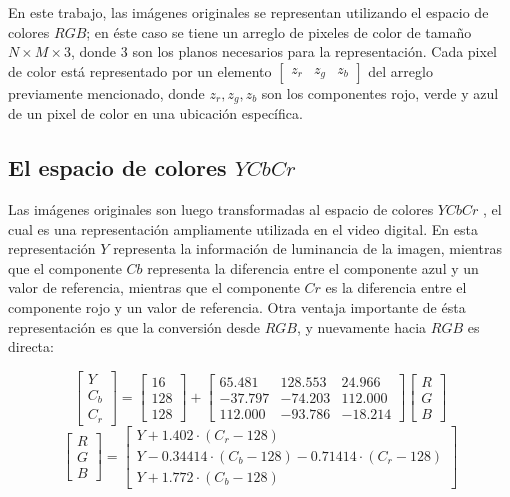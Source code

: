 En este trabajo, las imágenes originales se representan utilizando el espacio de colores $RGB$; en éste caso se tiene un arreglo de pixeles de color de tamaño $N \times M \times 3$, donde 3 son los planos necesarios para la representación. Cada pixel de color está representado por un elemento $[\begin{matrix}z_r & z_g & z_b\end{matrix}]$ del arreglo previamente mencionado, donde $z_r, z_g, z_b$ son los componentes rojo, verde y azul de un pixel de color en una ubicación específica. 

\subsection{El espacio de colores $YCbCr$}

Las imágenes originales son luego transformadas al espacio de colores $YCbCr$ \cite{gonzalez2002processing}, el cual es una representación ampliamente utilizada en el video digital. En esta representación $Y$ representa la información de luminancia de la imagen, mientras que el componente $Cb$ representa la diferencia entre el componente azul y un valor de referencia, mientras que el componente $Cr$ es la diferencia entre el componente rojo y un valor de referencia. Otra ventaja importante de ésta representación es que la conversión desde $RGB$, y nuevamente hacia $RGB$ es directa:

\begin{equation}
\begin{bmatrix}
Y \\
C_b \\
C_r 
\end{bmatrix} =
\begin{bmatrix}
16  \\
128 \\
128
\end{bmatrix}
+
\begin{bmatrix}
65.481 & 128.553 & 24.966 \\
-37.797 & -74.203 & 112.000 \\
112.000 & -93.786 & -18.214 
\end{bmatrix}
\begin{bmatrix}
R \\
G \\
B 
\end{bmatrix}
\end{equation}
\begin{equation}
\begin{bmatrix}
R \\
G \\
B 
\end{bmatrix} =
\begin{bmatrix}
Y + 1.402 \cdot (C_r - 128) \\
Y -0.34414 \cdot (C_b - 128) - 0.71414 \cdot (C_r - 128) \\
Y + 1.772 \cdot  (C_b - 128) 
\end{bmatrix}
\end{equation}

